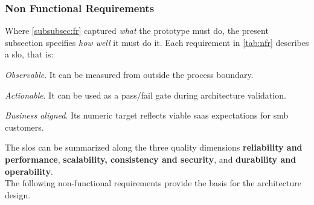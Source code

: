 \documentclass[11pt, a4paper, oneside, listof=totoc]{scrartcl}
\begin{document}
            \subsubsection{Non Functional Requirements}\label{subsubsec:nfr}

                Where \autoref{subsubsec:fr} captured \textit{what} the prototype must do, the
                present subsection specifies \textit{how well} it must do it.
                Each requirement in \autoref{tab:nfr} describes a \gls{slo}, that is:

                \begin{enumerate}[label={[\arabic*]:},
                    ref=Challenge~\arabic*,
                    leftmargin=*,
                    itemsep=0.6\baselineskip]

                    \item\label{chal:observable}
                        \textit{Observable}.
                        It can be measured from outside the process boundary.

                    \item\label{chal:actionable}
                        \textit{Actionable}.
                        It can be used as a pass/fail gate during architecture validation.

                    \item\label{chal:businessAligned}
                        \textit{Business aligned}.
                        Its numeric target reflects viable \gls{saas} expectations for \gls{smb}
                        customers.

            \end{enumerate}

            The \glspl{slo} can be summarized along the three quality dimensions
            \textbf{reliability and performance}, \textbf{scalability, consistency and security},
            and \textbf{durability and operability}.
            \\
            The following non-functional requirements provide the basis for the architecture design.
\end{document}
